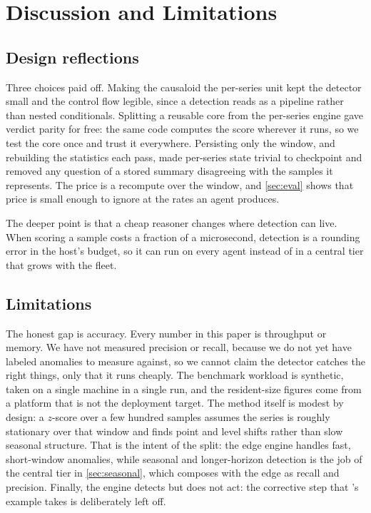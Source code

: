 \section{Discussion and Limitations}
\label{sec:discussion}

\subsection{Design reflections}
Three choices paid off. Making the causaloid the per-series unit kept the detector
small and the control flow legible, since a detection reads as a pipeline rather
than nested conditionals. Splitting a reusable core from the per-series engine gave
verdict parity for free: the same code computes the score wherever it runs, so we
test the core once and trust it everywhere. Persisting only the window, and
rebuilding the statistics each pass, made per-series state trivial to checkpoint and
removed any question of a stored summary disagreeing with the samples it
represents. The price is a recompute over the window, and \cref{sec:eval} shows
that price is small enough to ignore at the rates an agent produces.

The deeper point is that a cheap reasoner changes where detection can live. When
scoring a sample costs a fraction of a microsecond, detection is a rounding error in
the host's budget, so it can run on every agent instead of in a central tier that
grows with the fleet.

\subsection{Limitations}
The honest gap is accuracy. Every number in this paper is throughput or memory. We
have not measured precision or recall, because we do not yet have labeled anomalies
to measure against, so we cannot claim the detector catches the right things, only
that it runs cheaply. The benchmark workload is synthetic, taken on a single
machine in a single run, and the resident-size figures come from a platform that is
not the deployment target. The method itself is modest by design: a $z$-score over a
few hundred samples assumes the series is roughly stationary over that window and
finds point and level shifts rather than slow seasonal structure. That is the
intent of the split: the edge engine handles fast, short-window anomalies, while
seasonal and longer-horizon detection is the job of the central tier in
\cref{sec:seasonal}, which composes with the edge as recall and precision.
Finally, the engine detects but does not act: the corrective step that \dc{}'s
example takes is deliberately left off.


